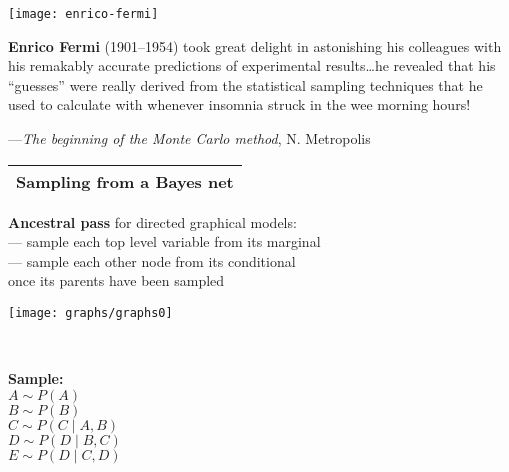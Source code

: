\documentclass[25pt,landscape]{foils}
\newcommand{\Gray}{\textcolor{mygray}}
\newcommand{\Green}{\textcolor{mypine}}
\newcommand{\myfoilhead}[1]{
\newpage
\vspace*{-1cm}
\Gray{
\begin{tabular*}{\textwidth}{l}
{\bf \Huge #1} \\
\bottomrule
\end{tabular*}}}
\newcommand{\g}{\!\mid\!} %
\begin{document}
\vfill

\begin{minipage}{0.43\linewidth}
\texttt{[image: enrico-fermi]}
\end{minipage}
\begin{minipage}{0.56\linewidth}
    \vfill
    {\bf Enrico Fermi} (1901--1954) took great delight in astonishing his
    colleagues with his remakably accurate predictions of experimental
    results\ldots he revealed that his ``guesses'' were really derived from the
    statistical sampling techniques that he used to calculate with whenever
    insomnia struck in the wee morning hours!

    \bigskip

    \begin{flushright}
        {\small ---{\em The beginning of the Monte Carlo method}, N. Metropolis}
    \end{flushright}

    \vfill
\end{minipage}

\vfill

\myfoilhead{Sampling from a Bayes net}

\vfill
\Green{\bf Ancestral pass} for directed graphical models:\\[0.1in]
\hspace*{3cm} --- sample each top level variable from its marginal\\[0.1in]
\hspace*{3cm} --- sample each other node from its conditional\\
\hspace*{3cm} \hphantom{---} once its parents have been sampled

\vfill

\begin{minipage}{0.35\linewidth}
    \vspace*{0.5cm}
    \texttt{[image: graphs/graphs0]}
\end{minipage}~~~~~~~
\begin{minipage}{0.6\linewidth}
    \Green{\bf Sample:}\\[0.1in]
    $A\sim P(A)$\\
    $B\sim P(B)$\\
    $C\sim P(C\g A,B)$\\
    $D\sim P(D\g B, C)$\\
    $E\sim P(D\g C, D)$
\end{minipage}
\end{document}
